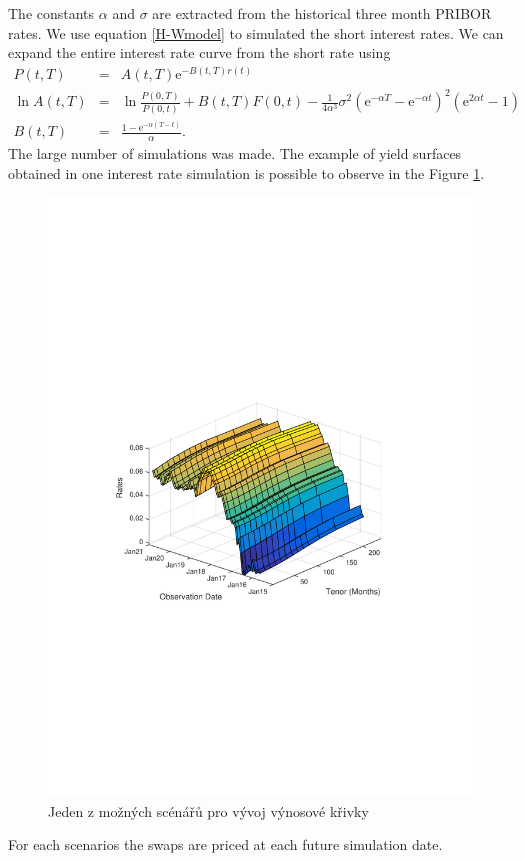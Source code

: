 \documentclass[a4paper,12pt]{report}
\theoremstyle{definition} \newtheorem{definice}[veta]{Definice}
\theoremstyle{remark}
\begin{document}
The constants $\alpha$ and $\sigma$ are extracted from the historical three month PRIBOR rates.
We use equation \eqref{H-Wmodel} to simulated the short interest rates.  
We can expand the entire interest rate curve from the short rate using
\begin{eqnarray}
P(t,T)&=&A(t,T)\mathrm{e}^{-B(t,T)r(t)}\\
\ln A(t,T)&=&\ln \frac{P(0,T)}{P(0,t)}+B(t,T)F(0,t)-\frac{1}{4\alpha^3}\sigma^2(\mathrm{e}^{-\alpha T}-\mathrm{e}^{-\alpha t})^2(\mathrm{e}^{2\alpha t}-1)  \nonumber\\
B(t,T)&=&\frac{1-\mathrm{e}^{-\alpha(T-t)}}{\alpha}.\nonumber
\end{eqnarray}
The large number of simulations was made. 
The example of yield surfaces obtained in one interest rate simulation is possible to observe in the Figure \ref{YieldCurveEvolution}.
\begin{figure}[!htbp]
  \centering 
	\includegraphics[width=13cm, clip, trim= 90 270 110 270]{IMG/YieldCurveEvolution1N.pdf}
     \caption{Jeden z možných scénářů pro vývoj výnosové křivky}  \label{YieldCurveEvolution}
\end{figure}
For each scenarios the swaps are priced at each future simulation date. 
\end{document}
